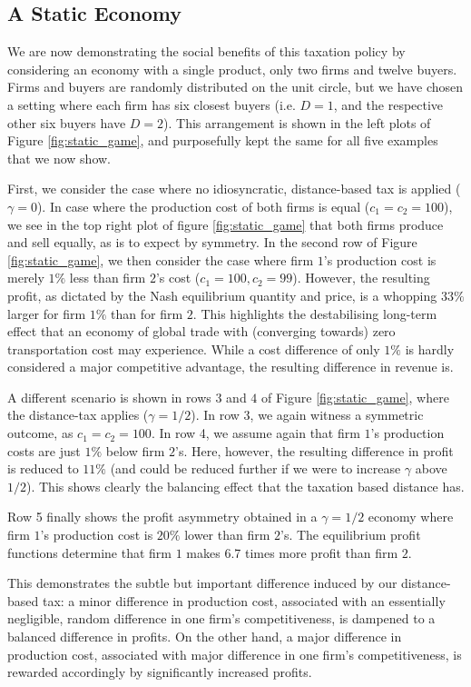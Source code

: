 \documentclass[final,3p,times,authoryear,12pt]{elsarticle}
\begin{document}
\subsection{A Static Economy} 
\label{sec:static_economy}

We are now demonstrating the social benefits of this taxation policy by considering an economy with a single product, only two firms and twelve buyers. 
Firms and buyers are randomly distributed on the unit circle, but we have chosen a setting where each firm has six closest buyers (i.e. $D=1$, and the respective other six buyers have $D=2$). 
This arrangement is shown in the left plots of Figure \ref{fig:static_game}, and purposefully kept the same for all five examples that we now show. 

First, we consider the case where no idiosyncratic, distance-based tax is applied ($\gamma=0$). 
In case where the production cost of both firms is equal ($c_1=c_2 = 100$), we see in the top right plot of figure \ref{fig:static_game} that both firms produce and sell equally, as is to expect by symmetry. 
In the second row of Figure \ref{fig:static_game}, we then consider the case where firm $1$'s production cost is merely $1\%$ less than firm $2$'s cost ($c_1=100, c_2=99$). 
However, the resulting profit, as dictated by the Nash equilibrium quantity and price, is a whopping $33\%$ larger for firm $1\%$ than for firm $2$. 
This highlights the destabilising long-term effect that an economy of global trade with (converging towards) zero transportation cost may experience. 
While a cost difference of only $1\%$ is hardly considered a major competitive advantage, the resulting difference in revenue is. 

A different scenario is shown in rows $3$ and $4$ of Figure \ref{fig:static_game}, where the distance-tax applies ($\gamma = 1/2$).
In row 3, we again witness a symmetric outcome, as $c_1 = c_2 = 100$. 
In row 4, we assume again that firm $1$'s production costs are just $1\%$ below firm $2$'s. 
Here, however, the resulting difference in profit is reduced to $11\%$ (and could be reduced further if we were to increase $\gamma$  above $1/2$). 
This shows clearly the balancing effect that the taxation based distance has. 

Row 5 finally shows the profit asymmetry obtained in a $\gamma=1/2$ economy where firm $1$'s production cost is $20\%$ lower than firm $2$'s. 
The equilibrium profit functions determine that firm $1$ makes 6.7 times more profit than firm $2$. 

This demonstrates the subtle but important difference induced by our distance-based tax:
a minor difference in production cost, associated with an essentially negligible, random difference in one firm's competitiveness, is dampened to a balanced difference in profits. 
On the other hand, a major difference in production cost, associated with major difference in one firm's competitiveness, is rewarded accordingly by significantly increased profits. 
\end{document}
